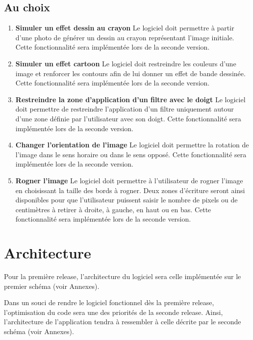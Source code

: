 \documentclass{article}
\begin{document}
\subsection{Au choix}
\label{fonctionnelsChoix}
\begin{enumerate}
\setcounter{enumi}{\thenumeroO}

\item{\bf Simuler un effet dessin au crayon} Le logiciel doit permettre à partir d'une photo de générer un dessin au crayon représentant l'image initiale. Cette fonctionnalité sera implémentée lors de la seconde version. 
\item{\bf Simuler un effet cartoon} Le logiciel doit restreindre les couleurs d'une image et renforcer les contours afin de lui donner un effet de bande dessinée. Cette fonctionnalité sera implémentée lors de la seconde version. 
\item{\bf Restreindre la zone d'application d'un filtre avec le doigt} Le logiciel doit permettre de restreindre l'application d'un filtre uniquement autour d'une zone définie par l'utilisateur avec son doigt. Cette fonctionnalité sera implémentée lors de la seconde version. 
\item{\bf Changer l'orientation de l'image} Le logiciel doit permettre la rotation de l'image dans le sens horaire ou dans le sens opposé. Cette fonctionnalité sera implémentée lors de la seconde version. 
\item{\bf Rogner l'image} Le logiciel doit permettre à l'utilisateur de rogner l'image en choisissant la taille des bords à rogner. Deux zones d'écriture seront ainsi disponibles pour que l'utilisateur puissent saisir le nombre de pixels ou de centimètres à retirer à droite, à gauche, en haut ou en bas. Cette fonctionnalité sera implémentée lors de la seconde version. 

\end{enumerate}


\section{Architecture}

Pour la première release, l'architecture du logiciel sera celle implémentée sur le premier schéma (voir Annexes).

Dans un souci de rendre le logiciel fonctionnel dès la première release, l'optimisation du code sera une des priorités de la seconde release. Ainsi, l'architecture de l'application tendra à ressembler à celle décrite par le seconde schéma (voir Annexes).
\end{document}

